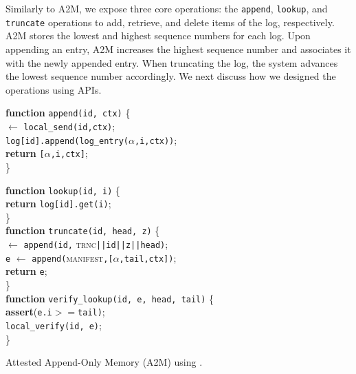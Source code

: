  Similarly to A2M, we expose three core operations: the \texttt{append}, \texttt{lookup}, and \texttt{truncate} operations to add, retrieve, and delete items of the log, respectively. A2M stores the lowest and highest sequence numbers for each log. Upon appending an entry, A2M increases the highest sequence number and associates it with the newly appended entry. When truncating the log, the system advances the lowest sequence number accordingly. We next discuss how we designed the operations using \projecttitle{} APIs.




\begin{algorithm}
\SetAlgoLined
\small
\textbf{function} \texttt{append(id, ctx)} \{ \\
 $\leftarrow$ \texttt{local\_send(id,ctx)};\\
 \texttt{log[id].append(log\_entry($\alpha$,\texttt{i},\texttt{ctx}))};\\
 {\bf return} \texttt{[$\alpha$,\texttt{i},\texttt{ctx}]};\\
\Indm
\} \\

\vspace{0.15cm}

\textbf{function} \texttt{lookup(id, i)} \{ \\
\Indp
    {\bf return} \texttt{log[id].get(i)};\\
\Indm
\} \\
\vspace{0.15cm}
\textbf{function} \texttt{truncate(id, head, z)} \{ \\
 $\leftarrow$ \texttt{append(id,} \textsc{trnc}\texttt{||id||z||head)};\\
        
    \texttt{e} $\leftarrow$ \texttt{append(}\textsc{manifest}\texttt{,[$\alpha$,\texttt{tail},\texttt{ctx}])};\\
    {\bf return} \texttt{e};\\
\Indm
\} \\

\vspace{0.15cm}
\textbf{function} \texttt{verify\_lookup(id, e, head, tail)} \{ \\
\Indp
    \textbf{assert}(\texttt{e.i}$>=$\texttt{tail)};\\
    \texttt{local\_verify(id, e)};\\
\Indm
\} \\
\vspace{-1pt}
\caption{Attested Append-Only Memory (A2M) using \projecttitle{}.}
\label{algo:tnic_log}
\end{algorithm}

